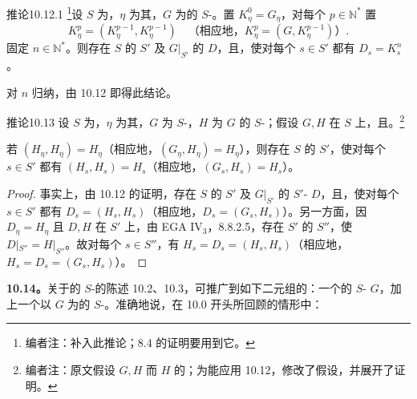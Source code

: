\begin{SGAresult}{推论}{10.12.1}
\footnote{编者注：补入此推论；8.4 的证明要用到它。}设 $S$ 为，$\eta$ 为其，$G$ 为的 $S$-。置 $K_\eta^0=G_\eta$，对每个 $p\in\mathbb N^*$ 置
\[
K_\eta^p=(K_\eta^{p-1},K_\eta^{p-1})
\quad\text{（相应地，}K_\eta^p=(G,K_\eta^{p-1})\text{）}.
\]
固定 $n\in\mathbb N^*$。则存在 $S$ 的 $S'$ 及 $G|_{S'}$ 的 $D$，且，使对每个 $s\in S'$ 都有 $D_s=K_s^n$。
\end{SGAresult}
对 $n$ 归纳，由 10.12 即得此结论。

\begin{SGAresult}{推论}{10.13}
设 $S$ 为，$\eta$ 为其，$G$ 为 $S$-，$H$ 为 $G$ 的 $S$-；假设 $G,H$ 在 $S$ 上，且。\footnote{编者注：原文假设 $G,H$ 而 $H$ 的；为能应用 10.12，修改了假设，并展开了证明。}

若 $(H_\eta,H_\eta)=H_\eta$（相应地，$(G_\eta,H_\eta)=H_\eta$），则存在 $S$ 的 $S'$，使对每个 $s\in S'$ 都有 $(H_s,H_s)=H_s$（相应地，$(G_s,H_s)=H_s$）。
\end{SGAresult}
\begin{proof}
事实上，由 10.12 的证明，存在 $S$ 的 $S'$ 及 $G|_{S'}$ 的 $S'$- $D$，且，使对每个 $s\in S'$ 都有 $D_s=(H_s,H_s)$（相应地，$D_s=(G_s,H_s)$）。另一方面，因 $D_\eta=H_\eta$ 且 $D,H$ 在 $S'$ 上，由 EGA IV$_3$，8.8.2.5，存在 $S'$ 的 $S''$，使 $D|_{S''}=H|_{S''}$。故对每个 $s\in S''$，有 $H_s=D_s=(H_s,H_s)$（相应地，$H_s=D_s=(G_s,H_s)$）。
\end{proof}

\textbf{10.14。}关于的 $S$-的陈述 10.2、10.3，可推广到如下二元组的：一个的 $S$- $G$，加上一个以 $G$ 为的 $S$-。准确地说，在 10.0 开头所回顾的情形中：

